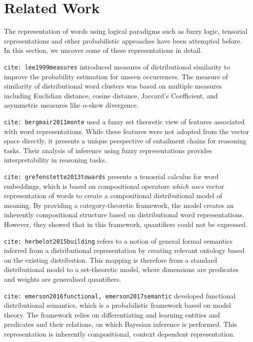 \documentclass[11pt]{book}
\newcommand{\citet}[1]{\texttt{cite: #1}}
\begin{document}
\section{Related Work} \label{sec: related}

The representation of words using logical paradigms such as fuzzy logic,
tensorial representations and other probabilistic approaches have been
attempted before. In this section, we uncover some of these representations in
detail. 

\citet{lee1999measures} introduced measures of distributional similarity to
improve the probability estimation for unseen occurrences. The measure of
similarity of distributional word clusters was based on multiple measures
including Euclidian distance, cosine distance, Jaccard's Coefficient, and
asymmetric measures like $\alpha$-skew divergence.

\citet{bergmair2011monte} used a fuzzy set theoretic view of features
associated with word representations. While these features were not adopted
from the vector space directly, it presents a unique perspective of entailment
chains for reasoning tasks. Their analysis of inference using fuzzy
representations provides interpretability in reasoning tasks.

\citet{grefenstette2013towards} presents a tenosrial calculus for word
embeddings, which is based on compositional operators \emph{which uses} vector
representation of words to create a compositional distributional model of
meaning. By providing a category-theoretic framework, the model creates an
inherently compositional structure based on distributional word
representations. However, they showed that in this framework, quantifiers could
not be expressed.

\citet{herbelot2015building} refers to a notion of general formal semantics
inferred from a distributional representation by creating relevant ontology
based on the existing distribution. This mapping is therefore from a standard
distributional model to a set-theoretic model, where dimensions are predicates
and weights are generalised quantifiers. 

\citet{emerson2016functional, emerson2017semantic} developed functional
distributional semantics, which is a probabilistic framework based on model
theory. The framework relies on differentiating and learning entities and
predicates and their relations, on which Bayesian inference is performed. This
representation is inherently compositional, context dependent representation. 
\end{document}
